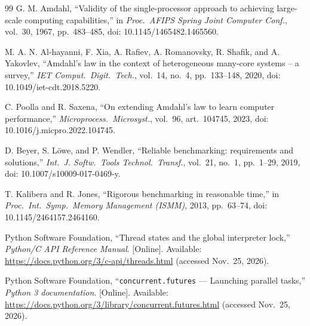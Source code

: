 \documentclass[conference]{IEEEtran}
\newcommand{\code}[1]{\texttt{#1}}
\begin{document}
\begin{thebibliography}{99}
G. M. Amdahl, ``Validity of the single-processor approach to achieving
large-scale computing capabilities,'' in \emph{Proc.\ AFIPS Spring Joint
Computer Conf.}, vol.\ 30, 1967, pp.\ 483--485, doi:
10.1145/1465482.1465560.

M. A. N. Al-hayanni, F. Xia, A. Rafiev, A. Romanovsky, R. Shafik, and
A. Yakovlev, ``Amdahl's law in the context of heterogeneous many-core
systems -- a survey,'' \emph{IET Comput.\ Digit.\ Tech.}, vol.~14,
no.~4, pp.~133--148, 2020, doi: 10.1049/iet-cdt.2018.5220.

C. Poolla and R. Saxena, ``On extending Amdahl's law to learn computer
performance,'' \emph{Microprocess.\ Microsyst.}, vol.~96, art.~104745,
2023, doi: 10.1016/j.micpro.2022.104745.

D. Beyer, S. L\"owe, and P. Wendler, ``Reliable benchmarking:
requirements and solutions,'' \emph{Int.\ J. Softw.\ Tools Technol.\
Transf.}, vol.~21, no.~1, pp.~1--29, 2019, doi:
10.1007/s10009-017-0469-y.

T. Kalibera and R. Jones, ``Rigorous benchmarking in reasonable time,''
in \emph{Proc.\ Int.\ Symp.\ Memory Management (ISMM)}, 2013,
pp.~63--74, doi: 10.1145/2464157.2464160.

Python Software Foundation, ``Thread states and the global interpreter
lock,'' \emph{Python/C API Reference Manual}. [Online]. Available:
\url{https://docs.python.org/3/c-api/threads.html} (accessed Nov.\ 25, 2026).

Python Software Foundation, ``\code{concurrent.futures} --- Launching
parallel tasks,'' \emph{Python 3 documentation}. [Online]. Available:
\url{https://docs.python.org/3/library/concurrent.futures.html}
(accessed Nov.\ 25, 2026).

\end{thebibliography}
\end{document}
